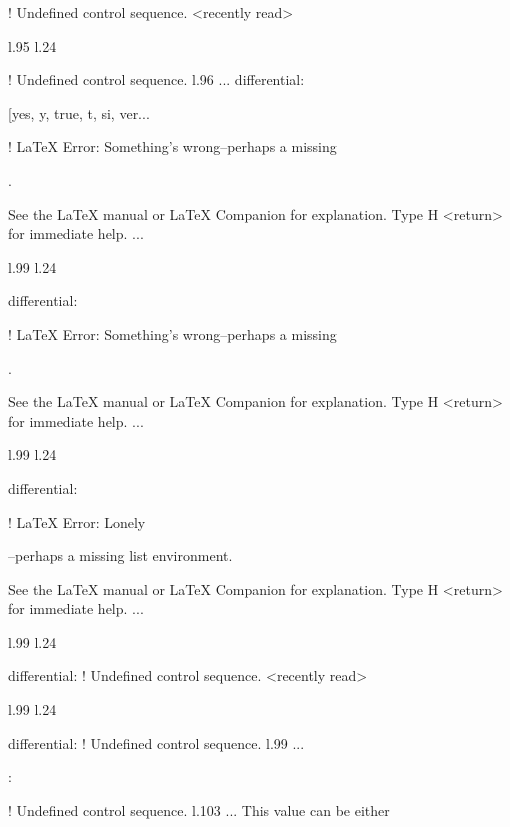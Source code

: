 {{{{{{{{{{{! Undefined control sequence.
<recently read> \xmlNode 
                         
l.95 l.24     \item \xmlNode
                            
! Undefined control sequence.
l.96 ...                  {differential}: \xmlDesc
                                                  {[yes, y, true, t, si, ver...


! LaTeX Error: Something's wrong--perhaps a missing \item.

See the LaTeX manual or LaTeX Companion for explanation.
Type  H <return>  for immediate help.
 ...                                              
                                                  
l.99 l.24     \item \xmlNode
                            {differential}: \xmlDesc

! LaTeX Error: Something's wrong--perhaps a missing \item.

See the LaTeX manual or LaTeX Companion for explanation.
Type  H <return>  for immediate help.
 ...                                              
                                                  
l.99 l.24     \item \xmlNode
                            {differential}: \xmlDesc

! LaTeX Error: Lonely \item--perhaps a missing list environment.

See the LaTeX manual or LaTeX Companion for explanation.
Type  H <return>  for immediate help.
 ...                                              
                                                  
l.99 l.24     \item \xmlNode
                            {differential}: \xmlDesc
! Undefined control sequence.
<recently read> \xmlNode 
                         
l.99 l.24     \item \xmlNode
                            {differential}: \xmlDesc
! Undefined control sequence.
l.99 ...    \item {}: \xmlDesc
                                                  
! Undefined control sequence.
l.103 ...      This value can be either \xmlString
                                                  
}}}}}}}}}}}}
